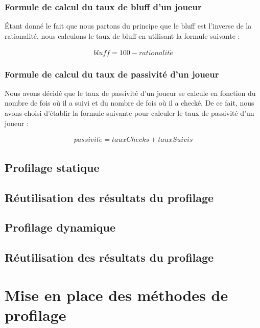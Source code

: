 \documentclass{report}
\begin{document}
\subsection{Formule de calcul du taux de bluff d'un joueur}

\hspace{0.5cm}Étant donné le fait que nous partons du principe que le bluff est l'inverse de la rationalité, nous calculons le taux de bluff en utilisant la formule suivante : \par

\begin{align*}
	bluff=100-rationalit\acute{e}
\end{align*}


\subsection{Formule de calcul du taux de passivité d'un joueur}

\hspace{0.5cm}Nous avons décidé que le taux de passivité d'un joueur se calcule en fonction du nombre de fois où il a suivi et du nombre de fois où il a checké. De ce fait, nous avons choisi d'établir la formule suivante pour calculer le taux de passivité d'un joueur : \par
\begin{align*}
	passivit\acute{e}=tauxChecks+tauxSuivis
\end{align*}


\section{Profilage statique}

\section{Réutilisation des résultats du profilage}

\section{Profilage dynamique}

\section{Réutilisation des résultats du profilage}


\chapter{Mise en place des méthodes de profilage}
\end{document}
